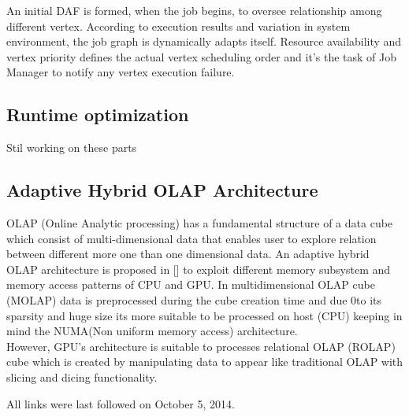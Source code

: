 \documentclass[runningheads,a4paper]{llncs}
\begin{document}
An initial DAF is formed, when the job begins, to oversee relationship among different vertex. According to execution results and variation in system environment, the job graph is dynamically adapts itself. Resource availability and vertex priority defines the actual vertex scheduling order and it's the task of Job Manager to notify any vertex execution failure.

\subsection*{Runtime optimization}

Stil working on these parts

\subsection*{Adaptive Hybrid OLAP Architecture}
OLAP (Online Analytic processing) has a fundamental structure of a data cube which consist of multi-dimensional data that enables user to explore relation between different more one than one dimensional data. An adaptive hybrid OLAP architecture is proposed in [] to exploit different memory subsystem and memory access patterns of CPU and GPU.  In multidimensional OLAP cube (MOLAP) data is preprocessed during the cube creation time and due 0to its sparsity and huge size its more suitable to be processed on host (CPU) keeping in mind the NUMA(Non uniform memory access) architecture.\\

However, GPU's architecture is suitable to processes relational OLAP (ROLAP) cube which is created by manipulating data to appear like traditional OLAP with slicing and dicing functionality.\\



\newpage



All links were last followed on October 5, 2014.
\nocite{*}
\end{document}
